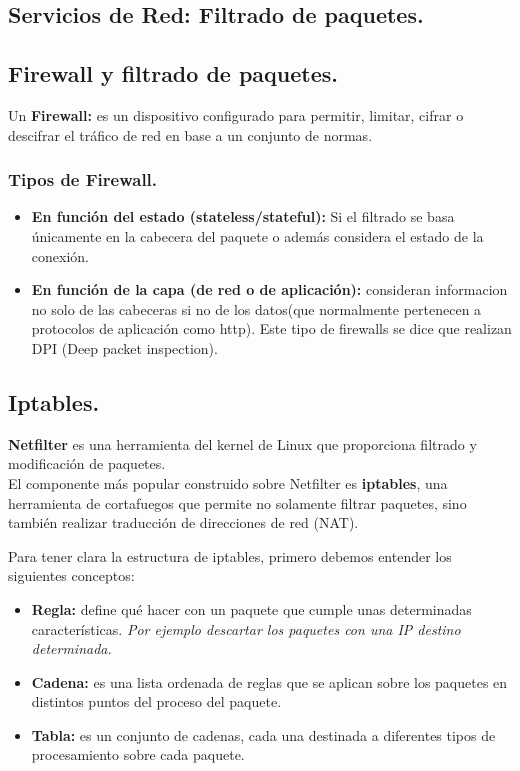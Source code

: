 \begin{onepage}


\section{Servicios de Red: Filtrado de paquetes.}
\subsection{Firewall y filtrado de paquetes.}
Un \textbf{Firewall:} es un dispositivo configurado para permitir, limitar, cifrar o descifrar el tráfico de red en base a un conjunto de normas.

\subsubsection{Tipos de Firewall.}
\begin{itemize}
    \item \textbf{En función del estado (stateless/stateful): }Si el filtrado se basa únicamente en la cabecera del paquete o además considera el estado de la conexión.
    \item \textbf{En función de la capa (de red o de aplicación):} consideran informacion no solo de las cabeceras si no de los datos(que normalmente pertenecen a protocolos de aplicación como http). Este tipo de firewalls se dice que realizan DPI (Deep packet inspection).
\end{itemize}

\subsection{Iptables.}
\textbf{Netfilter} es una herramienta del kernel de Linux que proporciona filtrado y modificación de paquetes.\\

El componente más popular construido sobre Netfilter es \textbf{iptables}, una herramienta de cortafuegos que permite no solamente filtrar paquetes, sino también realizar traducción de direcciones de red (NAT).\\
\begin{tcolorbox}[
colback=yellow!5!white,
colframe=yellow!75!cyan,
fonttitle=\bfseries]
Para tener clara la estructura de iptables, primero debemos entender los siguientes conceptos:
\begin{itemize}
    \item \textbf{Regla: }define qué hacer con un paquete que cumple unas determinadas características. \textit{Por ejemplo descartar los paquetes con una IP destino determinada.}
    \item \textbf{Cadena: }es una lista ordenada de reglas que se aplican sobre los paquetes en distintos puntos del proceso del paquete.
    \item \textbf{Tabla: }es un conjunto de cadenas, cada una destinada a diferentes tipos de procesamiento sobre cada paquete.
\end{itemize}
\end{tcolorbox}
\end{onepage}

